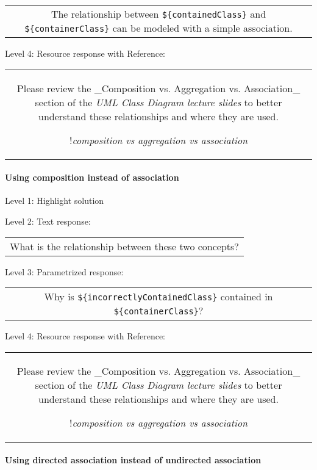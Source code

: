 \begin{tabular}{|c}
The relationship between \verb|${containedClass}| and \verb|${containerClass}| can be modeled with a simple association.
\end{tabular} \medskip

\noindent Level 4: Resource response with Reference:

\begin{tabular}{|c}
Please review the _Composition vs. Aggregation vs. Association_ section of 
the \textit{UML Class Diagram lecture slides} to 
better understand these relationships and where they are used.

!\textit{composition vs aggregation vs association}
\end{tabular} \medskip


\paragraph{Using composition instead of association}

\noindent Level 1: Highlight solution \medskip

\noindent Level 2: Text response: \medskip

\begin{tabular}{|c}
What is the relationship between these two concepts?
\end{tabular} \medskip

\noindent Level 3: Parametrized response: \medskip

\begin{tabular}{|c}
Why is \verb|${incorrectlyContainedClass}| contained in \verb|${containerClass}|?
\end{tabular} \medskip

\noindent Level 4: Resource response with Reference:

\begin{tabular}{|c}
Please review the _Composition vs. Aggregation vs. Association_ section of 
the \textit{UML Class Diagram lecture slides} to 
better understand these relationships and where they are used.

!\textit{composition vs aggregation vs association}
\end{tabular} \medskip


\paragraph{Using directed association instead of undirected association}

